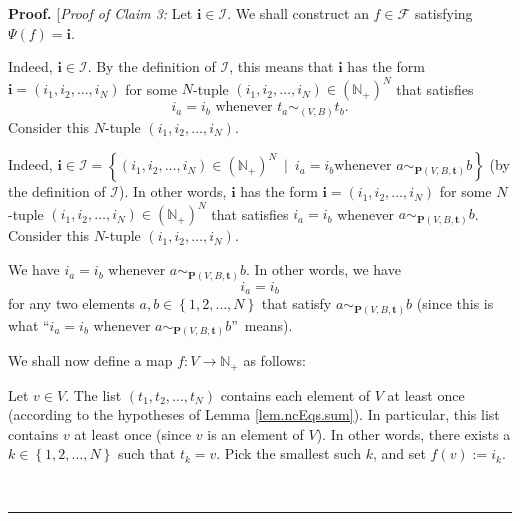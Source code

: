 \documentclass[numbers=enddot,12pt,final,onecolumn,notitlepage]{scrartcl}%
\theoremstyle{definition}
\newenvironment{proof}[1][Proof]{\noindent\textbf{#1.} }{\ \rule{0.5em}{0.5em}}
\newenvironment{verlong}{}{}
\newenvironment{vershort}{}{}
\begin{document}
\begin{proof}
[\textit{Proof of Claim 3:} Let $\mathbf{i}\in\mathcal{I}$. We shall construct
an $f\in\mathcal{F}$ satisfying $\Psi\left(  f\right)  =\mathbf{i}$.

\begin{vershort}
Indeed, $\mathbf{i}\in\mathcal{I}$. By the definition of $\mathcal{I}$, this
means that $\mathbf{i}$ has the form $\mathbf{i}=\left(  i_{1},i_{2}%
,\ldots,i_{N}\right)  $ for some $N$-tuple $\left(  i_{1},i_{2},\ldots
,i_{N}\right)  \in\left(  \mathbb{N}_{+}\right)  ^{N}$ that satisfies
\begin{equation}
i_{a}=i_{b}\text{ whenever }t_{a}\sim_{\left(  V,B\right)  }t_{b}.
\label{pf.lem.ncEqs.sum.short.c3.pf.1}%
\end{equation}
Consider this $N$-tuple $\left(  i_{1},i_{2},\ldots,i_{N}\right)  $.
\end{vershort}

\begin{verlong}
Indeed, $\mathbf{i}\in\mathcal{I}=\left\{  \left(  i_{1},i_{2},\ldots
,i_{N}\right)  \in\left(  \mathbb{N}_{+}\right)  ^{N}\ \mid\ i_{a}=i_{b}\text{
whenever }a\sim_{\mathbf{P}\left(  V,B,\mathbf{t}\right)  }b\right\}  $ (by
the definition of $\mathcal{I}$). In other words, $\mathbf{i}$ has the form
$\mathbf{i}=\left(  i_{1},i_{2},\ldots,i_{N}\right)  $ for some $N$-tuple
$\left(  i_{1},i_{2},\ldots,i_{N}\right)  \in\left(  \mathbb{N}_{+}\right)
^{N}$ that satisfies $i_{a}=i_{b}$ whenever $a\sim_{\mathbf{P}\left(
V,B,\mathbf{t}\right)  }b$. Consider this $N$-tuple $\left(  i_{1}%
,i_{2},\ldots,i_{N}\right)  $.

We have $i_{a}=i_{b}$ whenever $a\sim_{\mathbf{P}\left(  V,B,\mathbf{t}%
\right)  }b$. In other words, we have
\begin{equation}
i_{a}=i_{b} \label{pf.lem.ncEqs.sum.c3.pf.1}%
\end{equation}
for any two elements $a,b\in\left\{  1,2,\ldots,N\right\}  $ that satisfy
$a\sim_{\mathbf{P}\left(  V,B,\mathbf{t}\right)  }b$ (since this is what
\textquotedblleft$i_{a}=i_{b}$ whenever $a\sim_{\mathbf{P}\left(
V,B,\mathbf{t}\right)  }b$\textquotedblright\ means).
\end{verlong}

We shall now define a map $f:V\rightarrow\mathbb{N}_{+}$ as follows:

Let $v\in V$. The list $\left(  t_{1},t_{2},\ldots,t_{N}\right)  $ contains
each element of $V$ at least once (according to the hypotheses of Lemma
\ref{lem.ncEqs.sum}). In particular, this list contains $v$ at least once
(since $v$ is an element of $V$). In other words, there exists a $k\in\left\{
1,2,\ldots,N\right\}  $ such that $t_{k}=v$. Pick the smallest such $k$, and
set $f\left(  v\right)  :=i_{k}$.


\end{proof}
\end{document}
